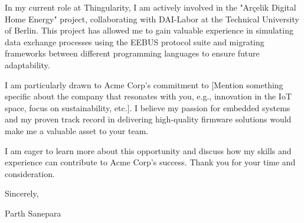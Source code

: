 \documentclass[letterpaper,11pt]{article}
\newcommand{\CompanyName}{Acme Corp}
\newcommand{\CurrentCompany}{Thingularity}
\begin{document}
  In my current role at \CurrentCompany{}, I am actively involved in the "Arçelik Digital Home Energy" project, collaborating with 
  DAI-Labor at the Technical University of Berlin. This project has allowed me to gain valuable experience in simulating data 
  exchange processes using the EEBUS protocol suite and migrating frameworks between different programming languages to ensure 
  future adaptability. \\ \vspace{3pt}

  I am particularly drawn to \CompanyName{}'s commitment to [Mention something specific about the company that resonates with you, 
  e.g., innovation in the IoT space, focus on sustainability, etc.]. I believe my passion for embedded systems and my proven track 
  record in delivering high-quality firmware solutions would make me a valuable asset to your team. \\ \vspace{3pt}

  I am eager to learn more about this opportunity and discuss how my skills and experience can contribute to \CompanyName{}'s success. 
  Thank you for your time and consideration.

\vspace{3cm}

  Sincerely,

  Parth Sanepara



\end{document}
